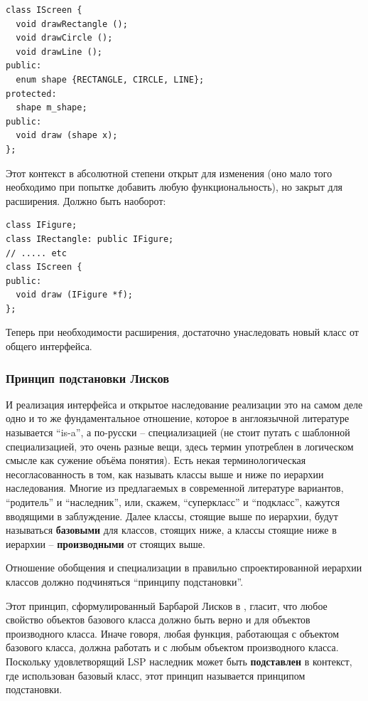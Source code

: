 \documentclass[a4paper,12pt,oneside]{article}
\begin{document}
\begin{lstlisting}
class IScreen {
  void drawRectangle ();
  void drawCircle ();
  void drawLine ();
public:
  enum shape {RECTANGLE, CIRCLE, LINE};
protected:
  shape m_shape;
public:
  void draw (shape x);  
};
\end{lstlisting}

Этот контекст в абсолютной степени открыт для изменения (оно мало того необходимо при попытке добавить любую функциональность), но закрыт для расширения. Должно быть наоборот:

\begin{lstlisting}
class IFigure;
class IRectangle: public IFigure;
// ..... etc
class IScreen {
public:
  void draw (IFigure *f);
};
\end{lstlisting}

Теперь при необходимости расширения, достаточно унаследовать новый класс от общего интерфейса.

\subsubsection{Принцип подстановки Лисков}\label{LSP}

И реализация интерфейса и открытое наследование реализации это на самом деле одно и то же фундаментальное отношение, которое в англоязычной литературе называется ``is-a'', а по-русски -- специализацией (не стоит путать с шаблонной специализацией, это очень разные вещи, здесь термин употреблен в логическом смысле как сужение объёма понятия). Есть некая терминологическая несогласованность в том, как называть классы выше и ниже по иерархии наследования. Многие из предлагаемых в современной литературе вариантов, ``родитель'' и ``наследник'', или, скажем, ``суперкласс'' и ``подкласс'', кажутся вводящими в заблуждение. Далее классы, стоящие выше по иерархии, будут называться \textbf{базовыми} для классов, стоящих ниже, а классы стоящие ниже в иерархии -- \textbf{производными} от стоящих выше.

Отношение обобщения и специализации в правильно спроектированной иерархии классов должно подчиняться ``принципу подстановки''. 

Этот принцип, сформулированный Барбарой Лисков в \cite{LSP}, гласит, что любое свойство объектов базового класса должно быть верно и для объектов производного класса. Иначе говоря, любая функция, работающая с объектом базового класса, должна работать и с любым объектом производного класса. Поскольку удовлетворящий LSP наследник может быть \textbf{подставлен} в контекст, где использован базовый класс, этот принцип называется принципом подстановки.
\end{document}
